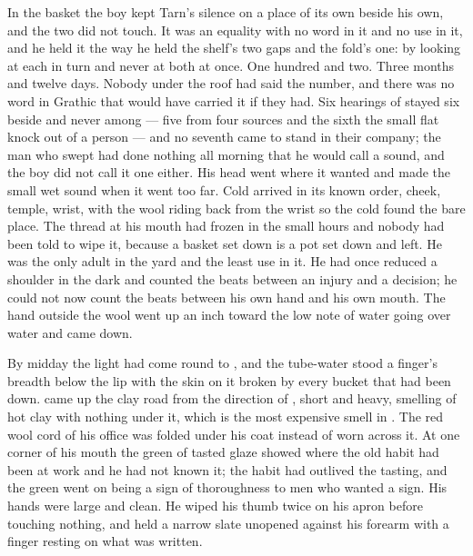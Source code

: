 In the basket the boy kept Tarn's silence on a place of its own beside his own, and the two did not touch. It was an equality with no word in it and no use in it, and he held it the way he held the shelf's two gaps and the fold's one: by looking at each in turn and never at both at once. One hundred and two. Three months and twelve days. Nobody under the roof had said the number, and there was no word in Grathic that would have carried it if they had. Six hearings of  stayed six beside and never among --- five from four sources and the sixth the small flat knock out of a person --- and no seventh came to stand in their company; the man who swept had done nothing all morning that he would call a sound, and the boy did not call it one either. His head went where it wanted and made the small wet sound when it went too far. Cold arrived in its known order, cheek, temple, wrist, with the wool riding back from the wrist so the cold found the bare place. The thread at his mouth had frozen in the small hours and nobody had been told to wipe it, because a basket set down is a pot set down and left. He was the only adult in the yard and the least use in it. He had once reduced a shoulder in the dark and counted the beats between an injury and a decision; he could not now count the beats between his own hand and his own mouth. The hand outside the wool went up an inch toward the low note of water going over water and came down.

\scenebreak

By midday the light had come round to , and the tube-water stood a finger's breadth below the lip with the skin on it broken by every bucket that had been down.  came up the clay road from the direction of , short and heavy, smelling of hot clay with nothing under it, which is the most expensive smell in . The red wool cord of his office was folded under his coat instead of worn across it. At one corner of his mouth the green of tasted glaze showed where the old habit had been at work and he had not known it; the habit had outlived the tasting, and the green went on being a sign of thoroughness to men who wanted a sign. His hands were large and clean. He wiped his thumb twice on his apron before touching nothing, and held a narrow slate unopened against his forearm with a finger resting on what was written.

